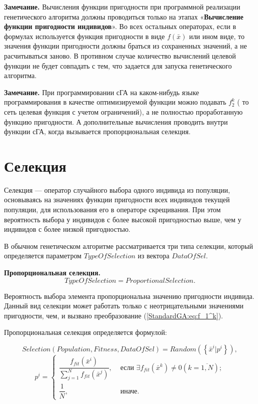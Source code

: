 \textbf{Замечание.} Вычисления функции пригодности при программной реализации генетического алгоритма должны проводиться только на этапах «\textbf{Вычисление функции пригодности индивидов}». Во всех остальных операторах, если в формулах используется функция пригодности в виде $f\left( \bar{x}\right) $ или ином виде, то значения функции пригодности должны браться из сохраненных значений, а не расчитываться заново. В противном случае количество вычислений целевой функции не будет совпадать с тем, что задается для запуска генетического алгоритма.

\textbf{Замечание.} При программировании сГА на каком-нибудь языке программирования в качестве оптимизируемой функции можно подавать $ f_2^k $ ( то сеть целевая функция с учетом ограничений), а не полностью проработанную функцию пригодности. А дополнительные вычисления проводить внутри функции сГА, когда вызывается пропорциональная селекция.

\section{Селекция} \label{StandardGA:subsection_selection}

Селекция --- оператор случайного выбора одного индивида из популяции, основываясь на значениях функции пригодности всех индивидов текущей популяции, для использования его в операторе скрещивания. При этом вероятность выбора у индивидов с более высокой пригодностью выше, чем у индивидов с более низкой пригодностью.

В обычном генетическом алгоритме рассматривается три типа селекции, который определяется параметром $ TypeOfSelection $ из вектора $ DataOfSel $.

\textbf{Пропорциональная селекция.}
\begin{equation}
\label{StandardGA:eq:ProportionalSelection}
TypeOfSelection=ProportionalSelection.
\end{equation}

Вероятность выбора элемента пропорциональна значению пригодности индивида. Данный вид селекции может работать только с неотрицательными значениями пригодности, чем, и вызвано преобразование (\ref{StandardGA:eq:f_1^k}).

Пропорциональная селекция определяется формулой:

\begin{equation}
\label{StandardGA:eq:ProportionalSelection2}
Selection\left( Population, Fitness, DataOfSel\right) = Random\left( \left\lbrace\bar{x}^i | p^i \right\rbrace \right),
\end{equation}
\begin{equation}
p^i=\left\lbrace \begin{aligned}
\dfrac{f_{fit}\left( \bar{x}^i\right) }{\sum_{j=1}^N{f_{fit}\left( \bar{x}^j\right)}},&\text { если }  \exists f_{fit}\left( \bar{x}^k\right)\neq 0 \left( k=\overline{1,N} \right); \\ \dfrac{1}{N} ,&\text { иначе}.
\end{aligned}\right.
\end{equation}

